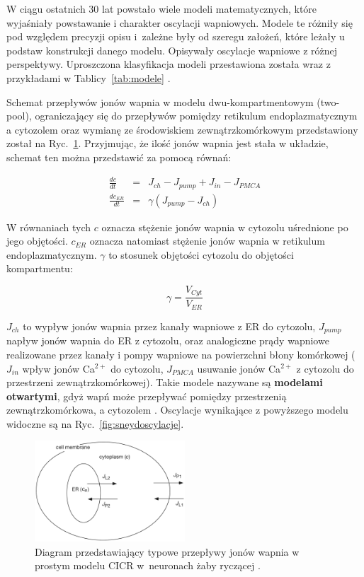 W ciągu ostatnich 30 lat powstało wiele modeli matematycznych, które wyjaśniały powstawanie i charakter oscylacji wapniowych.  Modele te różniły się pod względem precyzji opisu i~zależne były od szeregu założeń, które leżały u podstaw konstrukcji danego modelu. Opisywały oscylacje wapniowe z różnej perspektywy. Uproszczona klasyfikacja modeli przestawiona została wraz z przykładami w Tablicy~\ref{tab:modele} \cite{Dupont2011}.

Schemat przepływów jonów wapnia w modelu dwu-kompartmentowym (two-pool), ograniczający się do przepływów pomiędzy retikulum endoplazmatycznym a cytozolem oraz wymianę ze środowiskiem zewnątrzkomórkowym przedstawiony został na Ryc.~\ref{fig:sneydschemat}. Przyjmując, że ilość jonów wapnia jest stała w układzie, schemat ten można przedstawić za pomocą równań:

\begin{eqnarray}
\frac{dc}{dt} &=& J_{ch} -J_{pump} + J_{in} - J_{PMCA}\\
\frac{dc_{ER}}{dt} &=& \gamma(J_{pump} - J_{ch})
\end{eqnarray}

\noindent W równaniach tych $c$ oznacza stężenie jonów wapnia w cytozolu uśrednione po jego objętości. $c_{ER}$ oznacza natomiast stężenie jonów wapnia w retikulum endoplazmatycznym. $\gamma$ to stosunek objętości cytozolu do objętości kompartmentu:

\begin{equation}
\gamma = \frac{V_{Cyt}}{V_{ER}}
\end{equation}

$J_{ch}$ to wypływ jonów wapnia przez kanały wapniowe z ER do cytozolu, $J_{pump}$ napływ jonów wapnia do ER z cytozolu, oraz analogiczne prądy wapniowe realizowane przez kanały i pompy wapniowe na powierzchni błony komórkowej ($J_{in}$ wpływ jonów Ca$^{2+}$ do cytozolu, $J_{PMCA}$ usuwanie jonów Ca$^{2+}$ z cytozolu do przestrzeni zewnątrzkomórkowej).  Takie modele nazywane są \textbf{modelami otwartymi}, gdyż wapń może przepływać pomiędzy przestrzenią zewnątrzkomórkowa, a cytozolem \cite{Keener2009,Sneyd2004}. Oscylacje wynikające z powyższego modelu widoczne są na Ryc.~\ref{fig:sneydoscylacje}.

\begin{figure}
\includegraphics[width=0.5\textwidth]{rysunki/rozdzial_2/sneydSchematic.png}
\caption[Diagram prostych oscylacji]{Diagram przedstawiający typowe przepływy jonów wapnia w prostym modelu CICR w~neuronach żaby ryczącej \cite{Keener2009}.}
\label{fig:sneydschemat}
\end{figure}

